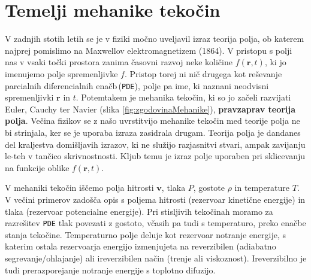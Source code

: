 \documentclass[11pt,a4paper,notitlepage]{article}
\begin{document}



	\section{Temelji mehanike tekočin}
		V zadnjih stotih letih se je v fiziki močno uveljavil izraz teorija polja, ob katerem najprej pomislimo na Maxwellov elektromagnetizem (1864). V pristopu s polji nas v vsaki točki prostora zanima časovni razvoj neke količine $f(\mathbf{r},t)$, ki jo imenujemo polje spremenljivke $f$. Pristop torej ni nič drugega kot reševanje parcialnih diferencialnih enačb\,(\texttt{PDE}), polje pa ime, ki naznani neodvisni spremenljivki $\mathbf{r}$ in $t$. Potemtakem je mehanika tekočin, ki so jo začeli razvijati Euler, Cauchy ter Navier (slika \ref{fig:zgodovinaMehanike}), \textbf{pravzaprav teorija polja}. Večina fizikov se z našo uvrstitvijo mehanike tekočin med teorije polja ne bi strinjala, ker se je uporaba izraza zasidrala drugam. Teorija polja je dandanes del kraljestva domišljavih izrazov, ki ne služijo razjasnitvi stvari, ampak zavijanju le-teh v tančico skrivnostnosti. Kljub temu je izraz polje uporaben pri sklicevanju na funkcije oblike $f(\mathbf{r},t)$.
		
		V mehaniki tekočin iščemo polja hitrosti $\mathbf{v}$, tlaka $P$, gostote $\rho$ in temperature $T$. V večini primerov zadošča opis s poljema hitrosti (rezervoar kinetične energije) in tlaka (rezervoar potencialne energije). Pri stisljivih tekočinah moramo za razrešitev \texttt{PDE} tlak povezati z gostoto, včasih pa tudi s temperaturo, preko enačbe stanja tekočine. Temperaturno polje deluje kot rezervoar notranje energije, s katerim ostala rezervoarja energijo izmenjujeta na reverzibilen (adiabatno segrevanje/ohlajanje) ali ireverzibilen način (trenje ali viskoznost). Ireverzibilno je tudi prerazporejanje notranje energije s toplotno difuzijo.
\end{document}
